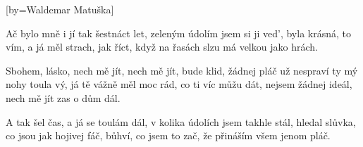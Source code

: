 [by={Waldemar Matuška}]

\beginverse{}
Ač bylo mně i jí tak šestnáct let,  
zeleným údolím jsem si ji ved', 
byla krásná, to vím, a já měl strach, jak říct,
když na řasách slzu má velkou jako hrách.
\endverse{}

\beginchorus{}
Sbohem, lásko, nech mě jít, nech mě jít, bude klid,
žádnej pláč už nespraví ty mý nohy toula vý,
já tě vážně měl moc rád, co ti víc můžu dát,
nejsem žádnej ideál, nech mě jít zas o dům dál.
\endchorus{}

\beginverse{}
A tak šel čas, a já se toulám dál,
v kolika údolích jsem takhle stál,
hledal slůvka, co jsou jak hojivej fáč, bůhví,
co jsem to zač, že přináším všem jenom pláč.
\endverse{}

\beginchorus{}

\endchorus{}

\endsong{}

